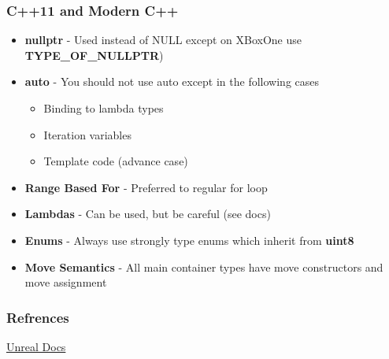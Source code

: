 \begin{frame}
  \frametitle{C++11 and Modern C++}
  \begin{itemize}
    \item \textbf{nullptr} - Used instead of NULL except on XBoxOne use \textbf{TYPE{\_}OF{\_}NULLPTR})
    \item \textbf{auto} - You should not use auto except in the following cases
    \begin{itemize}
      \item Binding to lambda types
      \item Iteration variables
      \item Template code (advance case)
    \end{itemize}
    \item \textbf{Range Based For} - Preferred to regular for loop
    \item \textbf{Lambdas} - Can be used, but be careful (see docs)
    \item \textbf{Enums} - Always use strongly type enums which inherit from \textbf{uint8}
    \item \textbf{Move Semantics} - All main container types have move constructors and move assignment
  \end{itemize}
\end{frame}

\begin{frame}
  \frametitle{Refrences}
  \url{Unreal Docs}
\end{frame}



